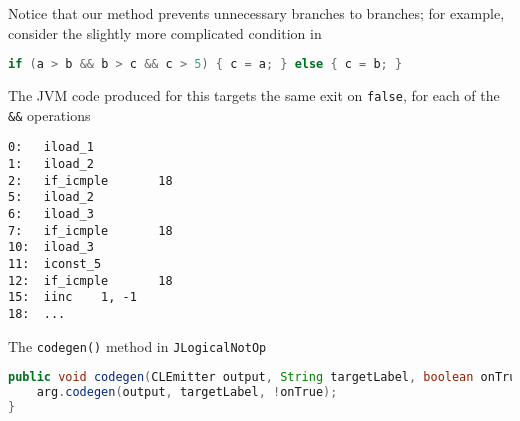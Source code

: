 \documentclass[8pt,a4paper,compress]{beamer}
\begin{document}
\begin{frame}[fragile]
\pause

Notice that our method prevents unnecessary branches to branches; for example, consider the slightly more complicated condition in
\begin{lstlisting}[language=Java]
if (a > b && b > c && c > 5) { c = a; } else { c = b; }

\end{lstlisting}

The JVM code produced for this targets the same exit on \lstinline{false}, for each of the \lstinline{&&} operations
\begin{lstlisting}[language={}]
0:   iload_1
1:   iload_2
2:   if_icmple       18
5:   iload_2
6:   iload_3
7:   if_icmple       18
10:  iload_3
11:  iconst_5
12:  if_icmple       18
15:  iinc    1, -1
18:  ...
\end{lstlisting}

\pause
\bigskip

The \lstinline{codegen()} method in \lstinline{JLogicalNotOp}
\begin{lstlisting}[language=Java]
public void codegen(CLEmitter output, String targetLabel, boolean onTrue) {
    arg.codegen(output, targetLabel, !onTrue);
}
\end{lstlisting}
\end{frame}
\end{document}
